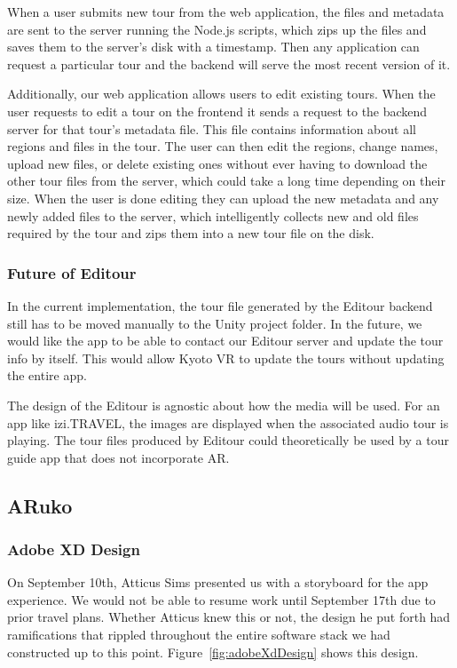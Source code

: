 \documentclass[a4paper, 10pt, american, titlepage]{article}
\begin{document}
When a user submits new tour from the web application, the files and metadata
are sent to the server running the Node.js scripts, which zips up the files and
saves them to the server's disk with a timestamp. Then any application can
request a particular tour and the backend will serve the most recent version of
it.

Additionally, our web application allows users to edit existing tours. When the
user requests to edit a tour on the frontend it sends a request to the backend
server for that tour's metadata file. This file contains information about all
regions and files in the tour. The user can then edit the regions, change names,
upload new files, or delete existing ones without ever having to download the
other tour files from the server, which could take a long time depending on
their size. When the user is done editing they can upload the new metadata and
any newly added files to the server, which intelligently collects new and old
files required by the tour and zips them into a new tour file on the disk.

\subsubsection{Future of Editour}
\label{sec:futureOfEditour}

In the current implementation, the tour file generated by the Editour backend
still has to be moved manually to the Unity project folder. In the future, we
would like the app to be able to contact our Editour server and update the tour
info by itself. This would allow Kyoto VR to update the tours without updating
the entire app.

The design of the Editour is agnostic about how the media will be used. For an
app like izi.TRAVEL, the images are displayed when the associated audio tour is
playing. The tour files produced by Editour could theoretically be used by a
tour guide app that does not incorporate AR. 

\subsection{ARuko}
\label{sec:aruko}

\subsubsection{Adobe XD Design}
\label{sec:adobeXdDesign}
On September 10th, Atticus Sims presented us with a storyboard for the app
experience. We would not be able to resume work until September 17th due to
prior travel plans. Whether Atticus knew this or not, the design he put forth
had ramifications that rippled throughout the entire software stack we had
constructed up to this point. Figure~\ref{fig:adobeXdDesign} shows this design.
\end{document}

